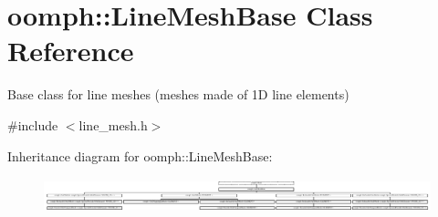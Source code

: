 \hypertarget{classoomph_1_1LineMeshBase}{}\section{oomph\+:\+:Line\+Mesh\+Base Class Reference}
\label{classoomph_1_1LineMeshBase}


Base class for line meshes (meshes made of 1D line elements)  




{\ttfamily \#include $<$line\+\_\+mesh.\+h$>$}

Inheritance diagram for oomph\+:\+:Line\+Mesh\+Base\+:\begin{figure}[H]
\begin{center}
\leavevmode
\includegraphics[height=1.025641cm]{classoomph_1_1LineMeshBase}
\end{center}
\end{figure}
